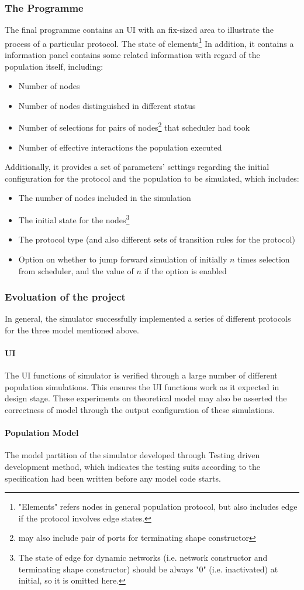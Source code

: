 \subsubsection{The Programme}
The final programme contains an UI with an fix-sized area to illustrate the process of
a particular protocol. The state of elements\footnote{\noindent "Elements" refers nodes in general population protocol,
but also includes edge if the protocol involves edge states.}
In addition, it contains a information panel contains some related
information with regard of the population itself, including:
\begin{itemize}
  \item Number of nodes
  \item Number of nodes distinguished in different status
  \item Number of selections for pairs of nodes\footnote{may also include pair of ports for terminating shape constructor} that scheduler had took
  \item Number of effective interactions the population executed
\end{itemize}

Additionally, it provides a set of parameters' settings regarding the initial configuration for the protocol and the population to be simulated, which includes:
\begin{itemize}
  \item The number of nodes included in the simulation
  \item The initial state for the nodes\footnote{\noindent The state of edge for dynamic networks (i.e. network constructor and terminating shape constructor) should be always "0" (i.e. inactivated) at initial, so it is omitted here.}
  \item The protocol type (and also different sets of transition rules for the protocol)
  \item Option on whether to jump forward simulation of initially $n$ times selection from scheduler, and the value of $n$ if the option is enabled
\end{itemize}

\subsubsection{Evoluation of the project}
In general, the simulator successfully implemented a series of different protocols for the three model mentioned above.

\paragraph{UI} The UI functions of simulator is verified through a large number of different population simulations. This ensures the UI functions work as it expected in design stage.
These experiments on theoretical model may also be asserted the correctness of model through the output configuration of these simulations.

\paragraph{Population Model} The model partition of the simulator developed through Testing driven development method, which indicates the testing suits according to the specification had been written before any
model code starts.
